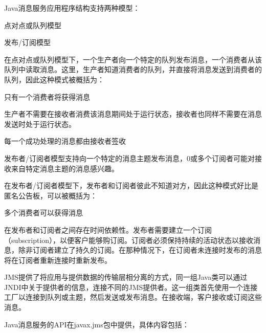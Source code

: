 Java消息服务应用程序结构支持两种模型：

\begin{compactitem}
\item 点对点或队列模型
\item 发布/订阅模型
\end{compactitem}

在点对点或队列模型下，一个生产者向一个特定的队列发布消息，一个消费者从该队列中读取消息。这里，生产者知道消费者的队列，并直接将消息发送到消费者的队列，因此这种模式被概括为：

\begin{compactitem}
\item 只有一个消费者将获得消息
\item 生产者不需要在接收者消费该消息期间处于运行状态，接收者也同样不需要在消息发送时处于运行状态。
\item 每一个成功处理的消息都由接收者签收
\end{compactitem}

发布者/订阅者模型支持向一个特定的消息主题发布消息，0或多个订阅者可能对接收来自特定消息主题的消息感兴趣。

在发布者/订阅者模型下，发布者和订阅者彼此不知道对方，因此这种模式好比是匿名公告板，可以被概括为：

\begin{compactitem}
\item 多个消费者可以获得消息
\item 在发布者和订阅者之间存在时间依赖性。发布者需要建立一个订阅（subscription），以便客户能够购订阅。订阅者必须保持持续的活动状态以接收消息，除非订阅者建立了持久的订阅。在那种情况下，在订阅者未连接时发布的消息将在订阅者重新连接时重新发布。
\end{compactitem}

JMS提供了将应用与提供数据的传输层相分离的方式，同一组Java类可以通过JNDI中关于提供者的信息，连接不同的JMS提供者。这一组类首先使用一个连接工厂以连接到队列或主题，然后发送或发布消息。在接收端，客户接收或订阅这些消息。

Java消息服务的API在javax.jms包中提供，具体内容包括：

